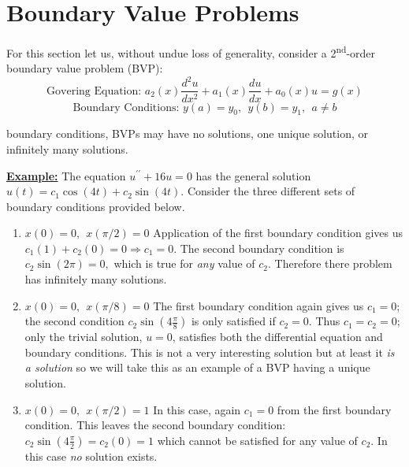 \section{Boundary Value Problems}
For this section let us, without undue loss of generality, consider a 2\textsuperscript{nd}-order boundary value problem (BVP):
\begin{equation}
\text{Govering Equation: }a_2(x)\frac{d^2u}{dx^2}+a_1(x)\frac{du}{dx}+a_0(x)u=g(x) 
\end{equation}
\begin{equation}
\text{Boundary Conditions: } y(a)=y_0, \ \ y(b)=y_1, \ \ a \ne b
\end{equation}

 boundary conditions, BVPs may have no solutions, one unique solution, or infinitely many solutions.

\vspace{1.0cm}
\noindent \underline{\textbf{Example:}} The equation $u^{\prime \prime}+16u = 0$ has the general solution $u(t) = c_1 \cos{(4t)}+c_2 \sin{(4t)}$.  Consider the three different sets of boundary conditions provided below.
\begin{enumerate}[label=\alph*)]
\item $x(0)=0, \ \ x(\pi/2)=0$
Application of the first boundary condition gives us $c_1(1)+c_2(0)=0 \Rightarrow c_1 = 0$.  The second boundary condition is $c_2\sin{(2 \pi)} = 0,$ which is true for \emph{any} value of $c_2$.  Therefore there problem has infinitely many solutions.
\item $x(0)=0, \ \ x(\pi/8)=0$
The first boundary condition again gives us $c_1=0$; the second condition $c_2\sin{(4 \frac{\pi}{8})}$ is only satisfied if $c_2=0$.  Thus $c_1 = c_2 = 0$; only the trivial solution, $u=0$, satisfies both the differential equation and boundary conditions.  This is not a very interesting solution but at least it \emph{is a solution} so we will take this as an example of a BVP having a unique solution.
\item $x(0)=0, \ \ x(\pi/2)=1$
In this case, again $c_1=0$ from the first boundary condition.  This leaves the second boundary condition: $c_2 \sin{\left(4 \frac{\pi}{2}\right)} = c_2(0) = 1$ which cannot be satisfied for any value of $c_2$.  In this case \emph{no} solution exists.

\end{enumerate}

